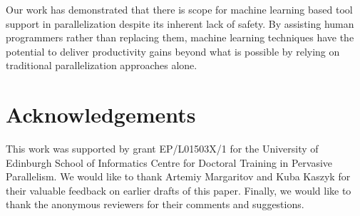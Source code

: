 Our work has demonstrated that there is scope for machine learning based tool support in parallelization despite its inherent lack of safety. By assisting human programmers rather than replacing them, machine learning techniques have the potential to deliver productivity gains beyond what is possible by relying on traditional parallelization approaches alone.

\section*{Acknowledgements}

This work was supported by grant EP/L01503X/1 for the University of Edinburgh School of Informatics Centre for Doctoral Training in Pervasive Parallelism. We would like to thank Artemiy Margaritov and Kuba Kaszyk for their valuable feedback on earlier drafts of this paper. Finally, we would like to thank the anonymous reviewers for their comments and suggestions.






